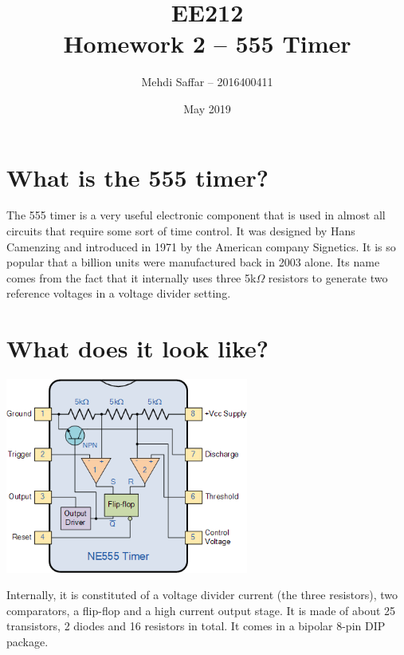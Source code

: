 \documentclass[12pt]{extarticle}
\title{EE212 \\ Homework 2 --  555 Timer}
\author{Mehdi Saffar -- 2016400411}
\date{May 2019}
\begin{document}
\maketitle
\section{What is the 555 timer?}
The 555 timer is a very useful electronic component that is used in almost all circuits that require some sort of time control. It was designed by Hans Camenzing and introduced in 1971 by the American company Signetics. It is so popular that a billion units were manufactured back in 2003 alone. Its name comes from the fact that it internally uses three 5k$\Omega$ resistors to generate two reference voltages in a voltage divider setting.

\section{What does it look like?}
\begin{center}
\includegraphics[width=8cm]{form.png}
\end{center}
Internally, it is constituted of a voltage divider current (the three resistors), two comparators, a flip-flop and a high current output stage. It is made of about 25 transistors, 2 diodes and 16 resistors in total. It comes in a bipolar 8-pin DIP package.
\end{document}
